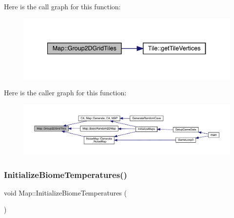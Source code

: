 Here is the call graph for this function\+:
\nopagebreak
\begin{figure}[H]
\begin{center}
\leavevmode
\includegraphics[width=340pt]{dd/d11/class_map_af2b4481fa4588c8aa5ab6e8c45c5f7cf_cgraph}
\end{center}
\end{figure}
Here is the caller graph for this function\+:
\nopagebreak
\begin{figure}[H]
\begin{center}
\leavevmode
\includegraphics[width=350pt]{dd/d11/class_map_af2b4481fa4588c8aa5ab6e8c45c5f7cf_icgraph}
\end{center}
\end{figure}
\mbox{\label{class_map_ae5a05885aef979310e900b8343679abd}} 
\subsubsection{\texorpdfstring{Initialize\+Biome\+Temperatures()}{InitializeBiomeTemperatures()}}
{\footnotesize\ttfamily void Map\+::\+Initialize\+Biome\+Temperatures (\begin{DoxyParamCaption}{ }\end{DoxyParamCaption})}

